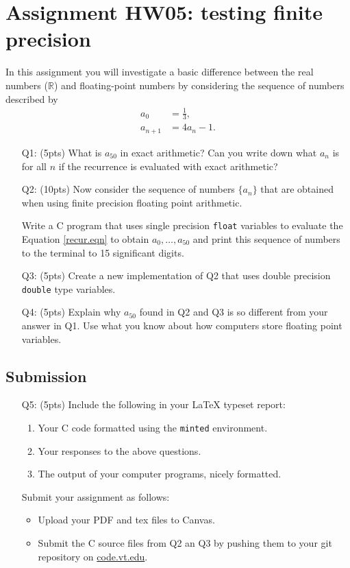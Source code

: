 

\section{Assignment HW05: testing finite precision}
In this assignment you will investigate a basic difference between the real numbers ($\mathbb R$) and floating-point numbers by considering the sequence of numbers described by
    \begin{align}
        a_0&=\frac13,\\
        a_{n+1}&=4a_n-1. \label{recur.eqn}
    \end{align}
    
\begin{enumerate}
    \item[Q1:] (5pts) What is $a_{50}$ in exact arithmetic? Can you write down what $a_n$ is for all $n$ if the recurrence is evaluated with exact arithmetic?
    \item[Q2:] (10pts) Now consider the sequence of numbers $\{a_n\}$ that are obtained when using finite precision floating point arithmetic.
    
    Write a C program that uses single precision \texttt{float} variables to evaluate the Equation \ref{recur.eqn} to obtain $a_0,\dots,a_{50}$ and print this sequence of numbers to the terminal to 15 significant digits.
   
    \item[Q3:] (5pts) Create a new implementation of Q2 that uses double precision \texttt{double} type variables. 
    \item[Q4:] (5pts) Explain why $a_{50}$ found in Q2 and Q3 is so different from your answer in Q1.
    Use what you know about how computers store floating point variables.
\end{enumerate}

\subsection*{Submission}
\begin{itemize}
    \item[Q5:] (5pts) Include the following in your \LaTeX{} typeset report:
    \begin{enumerate}
        \item Your C code formatted using the \texttt{minted} environment.
        \item Your responses to the above questions. 
        \item The output of your computer programs, nicely formatted.
    \end{enumerate}
 
    Submit your assignment as follows:
    \begin{itemize}
    \item Upload your PDF and tex files to Canvas.
    \item Submit the C source files from Q2 an Q3 by pushing them to your git repository on \href{code.vt.edu}{code.vt.edu}.
    \end{itemize}
\end{itemize}



